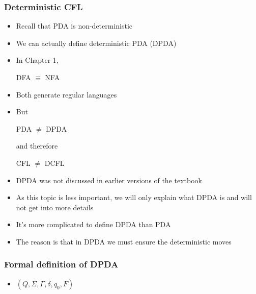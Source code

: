 




\begin{frame}[allowframebreaks] \frametitle{Deterministic CFL}
  \begin{itemize}
  \item Recall that PDA is \alert{non-deterministic}
  \item We can actually define \alert{deterministic} PDA (DPDA)
    
\item In Chapter 1,
  \begin{center}
    DFA $\equiv$ NFA
  \end{center}
\item [] Both generate regular languages
\item But 
  \begin{center}
    PDA $\neq$ DPDA
  \end{center}
and therefore
\begin{center}
  CFL $\neq$ DCFL
\end{center}
\item DPDA was not discussed in earlier versions of the textbook
\item As this topic is less important, we will only explain what DPDA is
  and will not get into more details
\item It's more complicated to define DPDA than PDA
\item The reason is that in DPDA we must ensure the deterministic moves
\end{itemize}\end{frame} \begin{frame}[allowframebreaks] \frametitle{Formal definition of DPDA}
  \begin{itemize}
\item $(Q,\Sigma, \Gamma, \delta, q_0, F)$


\end{itemize}
\end{frame}
